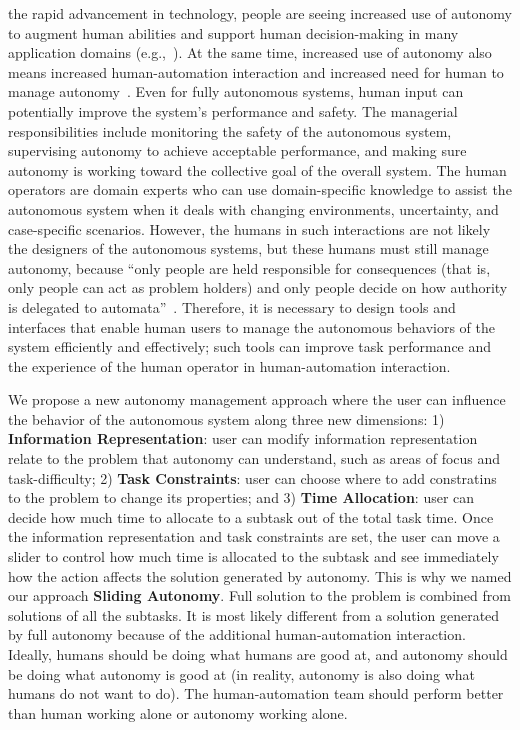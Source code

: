 \documentclass[journal]{IEEEtran}
\begin{document}
 the rapid advancement in technology, people are seeing increased use of autonomy to augment human abilities and support human decision-making in many application domains (e.g.,~\cite{Chun2010Limousine,Casper2003Human,Lin2010Supporting,Robins2009From}). At the same time, increased use of autonomy also means increased human-automation interaction and increased need for human to manage autonomy~\cite{Bainbridge1983Ironies}. Even for fully autonomous systems, human input can potentially improve the system's performance and safety. The managerial responsibilities include monitoring the safety of the autonomous system, supervising autonomy to achieve acceptable performance, and making sure autonomy is working toward the collective goal of the overall system. The human operators are domain experts who can use domain-specific knowledge to assist the autonomous system when it deals with changing environments, uncertainty, and case-specific scenarios. However, the humans in such interactions are not likely the designers of the autonomous systems, but these humans must still manage autonomy, because ``only people are held responsible for consequences (that is, only people can act as problem holders) and only people decide on how authority is delegated to automata''~\cite{Woods2006Joint,Bradshaw2013Seven}. Therefore, it is necessary to design tools and interfaces that enable human users to manage the autonomous behaviors of the system efficiently and effectively; such tools can improve task performance and the experience of the human operator in human-automation interaction.

We propose a new autonomy management approach where the user can influence the behavior of the autonomous system along three new dimensions: 1) \textbf{Information Representation}: user can modify information representation relate to the problem that autonomy can understand, such as areas of focus and task-difficulty; 2) \textbf{Task Constraints}: user can choose where to add constratins to the problem to change its properties; and 3) \textbf{Time Allocation}: user can decide how much time to allocate to a subtask out of the total task time. Once the information representation and task constraints are set, the user can move a slider to control how much time is allocated to the subtask and see immediately how the action affects the solution generated by autonomy. This is why we named our approach \textbf{Sliding Autonomy}. Full solution to the problem is combined from solutions of all the subtasks. It is most likely different from a solution generated by full autonomy because of the additional human-automation interaction. Ideally, humans should be doing what humans are good at, and autonomy should be doing what autonomy is good at (in reality, autonomy is also doing what humans do not want to do). The human-automation team should perform better than human working alone or autonomy working alone.
\end{document}
